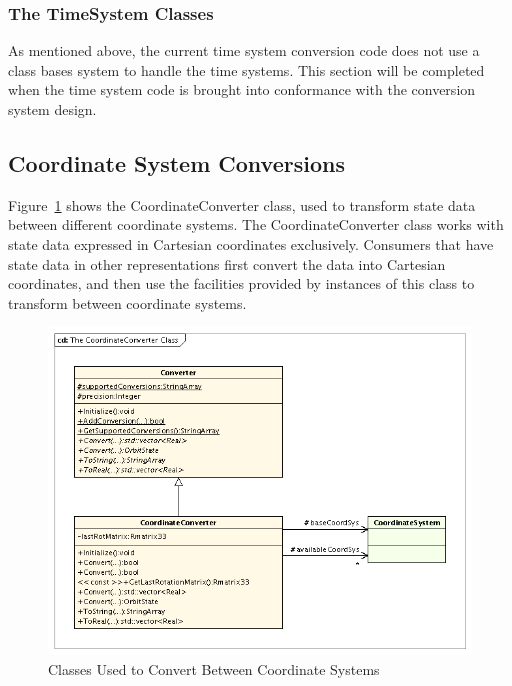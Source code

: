 \subsubsection{The TimeSystem Classes}

As mentioned above, the current time system conversion code does not use a class bases system to
handle the time systems.  This section will be completed when the time system code is brought into
conformance with the conversion system design.

\subsection{Coordinate System Conversions}

Figure~\ref{figure:CoordinateConverterClasses} shows the CoordinateConverter class, used to
transform state data between different coordinate systems.  The CoordinateConverter class works
with state data expressed in Cartesian coordinates exclusively.  Consumers that have state data in
other representations first convert the data into Cartesian coordinates, and then use the
facilities provided by instances of this class to transform between coordinate systems.

\begin{figure}[htb]
\begin{center}
\includegraphics[325,253]{Images/TheCoordinateConverterClass.png}
\caption{\label{figure:CoordinateConverterClasses}Classes Used to Convert Between Coordinate
Systems}
\end{center}
\end{figure}

